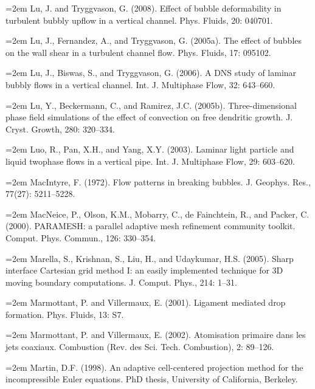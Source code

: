 \documentclass[11pt,a4paper,openany,fontset=none]{ctexbook}
\begin{document}
\par\hangindent=2em Lu, J. and Tryggvason, G. (2008). Effect of bubble deformability in turbulent bubbly upflow in a vertical channel. Phys. Fluids, 20: 040701.

\par\hangindent=2em Lu, J., Fernandez, A., and Tryggvason, G. (2005a). The effect of bubbles on the wall shear in a turbulent channel flow. Phys. Fluids, 17: 095102.

\par\hangindent=2em Lu, J., Biswas, S., and Tryggvason, G. (2006). A DNS study of laminar bubbly flows in a vertical channel. Int. J. Multiphase Flow, 32: 643--660.

\par\hangindent=2em Lu, Y., Beckermann, C., and Ramirez, J.C. (2005b). Three-dimensional phase field simulations of the effect of convection on free dendritic growth. J. Cryst. Growth, 280: 320--334.

\par\hangindent=2em Luo, R., Pan, X.H., and Yang, X.Y. (2003). Laminar light particle and liquid twophase flows in a vertical pipe. Int. J. Multiphase Flow, 29: 603--620.

\par\hangindent=2em MacIntyre, F. (1972). Flow patterns in breaking bubbles. J. Geophys. Res., 77(27): 5211--5228.

\par\hangindent=2em MacNeice, P., Olson, K.M., Mobarry, C., de Fainchtein, R., and Packer, C. (2000). PARAMESH: a parallel adaptive mesh refinement community toolkit. Comput. Phys. Commun., 126: 330--354.

\par\hangindent=2em Marella, S., Krishnan, S., Liu, H., and Udaykumar, H.S. (2005). Sharp interface Cartesian grid method I: an easily implemented technique for 3D moving boundary computations. J. Comput. Phys., 214: 1--31.

\par\hangindent=2em Marmottant, P. and Villermaux, E. (2001). Ligament mediated drop formation. Phys. Fluids, 13: S7.

\par\hangindent=2em Marmottant, P. and Villermaux, E. (2002). Atomisation primaire dans les jets coaxiaux. Combustion (Rev. des Sci. Tech. Combustion), 2: 89--126.

\par\hangindent=2em Martin, D.F. (1998). An adaptive cell-centered projection method for the incompressible Euler equations. PhD thesis, University of California, Berkeley.
\end{document}
